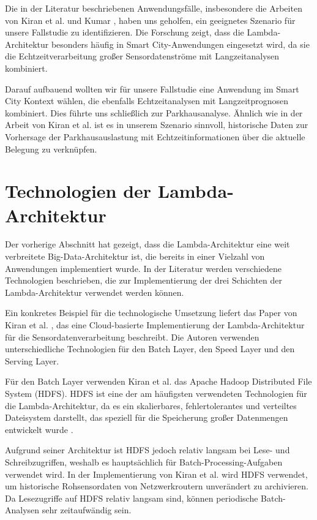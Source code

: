 Die in der Literatur beschriebenen Anwendungsfälle, insbesondere die Arbeiten von Kiran et al. \cite{kiran2015lambda} und Kumar \cite{kumar2020lambda}, haben uns geholfen, ein geeignetes Szenario für unsere Fallstudie zu identifizieren. Die Forschung zeigt, dass die Lambda-Architektur besonders häufig in Smart City-Anwendungen eingesetzt wird, da sie die Echtzeitverarbeitung großer Sensordatenströme mit Langzeitanalysen kombiniert.

Darauf aufbauend wollten wir für unsere Fallstudie eine Anwendung im Smart City Kontext wählen, die ebenfalls Echtzeitanalysen mit Langzeitprognosen kombiniert. Dies führte uns schließlich zur Parkhausanalyse. Ähnlich wie in der Arbeit von Kiran et al. \cite{kiran2015lambda} ist es in unserem Szenario sinnvoll, historische Daten zur Vorhersage der Parkhausauslastung mit Echtzeitinformationen über die aktuelle Belegung zu verknüpfen.

\section{Technologien der Lambda-Architektur}
Der vorherige Abschnitt hat gezeigt, dass die Lambda-Architektur eine weit verbreitete Big-Data-Architektur ist, die bereits in einer Vielzahl von Anwendungen implementiert wurde. In der Literatur werden verschiedene Technologien beschrieben, die zur Implementierung der drei Schichten der Lambda-Architektur verwendet werden können.

Ein konkretes Beispiel für die technologische Umsetzung liefert das Paper von Kiran et al. \cite{kiran2015lambda}, das eine Cloud-basierte Implementierung der Lambda-Architektur für die Sensordatenverarbeitung beschreibt. Die Autoren verwenden unterschiedliche Technologien für den Batch Layer, den Speed Layer und den Serving Layer.

Für den Batch Layer verwenden Kiran et al. \cite{kiran2015lambda} das Apache Hadoop Distributed File System (HDFS). HDFS ist eine der am häufigsten verwendeten Technologien für die Lambda-Architektur, da es ein skalierbares, fehlertolerantes und verteiltes Dateisystem darstellt, das speziell für die Speicherung großer Datenmengen entwickelt wurde \cite{ganelin2016spark}.

Aufgrund seiner Architektur ist HDFS jedoch relativ langsam bei Lese- und Schreibzugriffen, weshalb es hauptsächlich für Batch-Processing-Aufgaben verwendet wird. In der Implementierung von Kiran et al. wird HDFS verwendet, um historische Rohsensordaten von Netzwerkroutern unverändert zu archivieren. Da Lesezugriffe auf HDFS relativ langsam sind, können periodische Batch-Analysen sehr zeitaufwändig sein.

